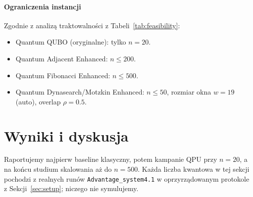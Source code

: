 \documentclass[11pt,a4paper]{article}
\begin{document}
\paragraph{Ograniczenia instancji}
Zgodnie z analizą traktowalności z Tabeli~\ref{tab:feasibility}:
\begin{itemize}
  \item Quantum QUBO (oryginalne): tylko $n=20$.
  \item Quantum Adjacent Enhanced: $n\le200$.
  \item Quantum Fibonacci Enhanced: $n\le500$.
  \item Quantum Dynasearch/Motzkin Enhanced: $n\le50$, rozmiar okna
        $w=19$ (auto), overlap $\rho=0.5$.
\end{itemize}

\section{Wyniki i dyskusja}
\label{sec:results}

Raportujemy najpierw baseline klasyczny, potem kampanie QPU przy
$n=20$, a na końcu studium skalowania aż do $n=500$. Każda liczba
kwantowa w tej sekcji pochodzi z realnych runów
\texttt{Advantage\_system4.1} w oprzyrządowanym protokole
z Sekcji~\ref{sec:setup}; niczego nie symulujemy.
\end{document}
